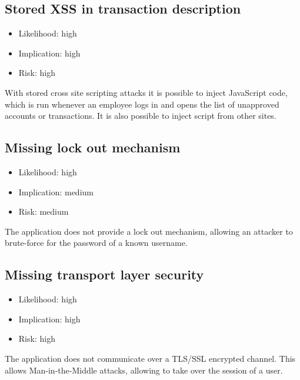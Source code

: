 \subsection{Stored XSS in transaction description}
\begin{itemize}
	\item Likelihood: high
	\item Implication: high
	\item Risk: high
\end{itemize}

With stored cross site scripting attacks it is possible to inject JavaScript code, which is run whenever an employee logs in and opens the list of unapproved accounts or transactions. It is also possible to inject script from other sites.

\subsection{Missing lock out mechanism}
\begin{itemize}
	\item Likelihood: high
	\item Implication: medium
	\item Risk: medium
\end{itemize}

The application does not provide a lock out mechanism, allowing an attacker to brute-force for the password of a known username.

\subsection{Missing transport layer security}
\begin{itemize}
	\item Likelihood: high
	\item Implication: high
	\item Risk: high
\end{itemize}

The application does not communicate over a TLS/SSL encrypted channel. This allows Man-in-the-Middle attacks, allowing to take over the session of a user.

